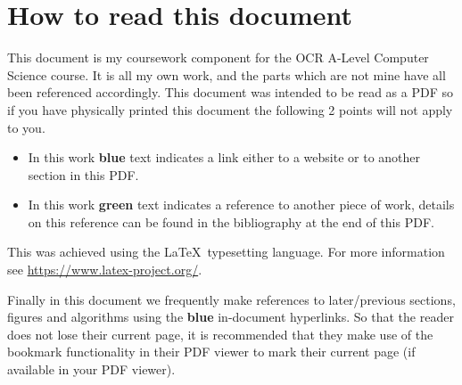 \pagestyle{fancy}
\chead{\mdseries \thepage}

\section*{How to read this document}

This document is my coursework component for the OCR A-Level
Computer Science course. It is all my own work, and the parts
which are not mine have all been referenced accordingly. This
document was intended to be read as a PDF so if you have
physically printed this document the following
2 points will not apply to you.\\ \vspace{0.2cm}

\begin{itemize}

\item{
In this work { \color{blue} \textbf{blue} } text indicates a
link either to a website or to another section in this PDF. \\
\vspace{0.2cm}
}

\item{
In this work { \color{green} \textbf{green} } text indicates a
reference to another piece of work, details on this reference
can be found in the bibliography at the end of this PDF.\\
\vspace{0.2cm}
}

\end{itemize}

This was achieved using the \LaTeX \ typesetting language.
For more information see \url{https://www.latex-project.org/}.
\\ \vspace{0.2cm}

Finally in this document we frequently make references to
later/previous sections, figures and algorithms using the
{ \color{blue} \textbf{blue} } in-document hyperlinks. So
that the reader does not lose their current page, it
is recommended that they make use of the bookmark functionality
in their PDF viewer to mark their current page
(if available in your PDF viewer). \\ \vspace{0.2cm}

